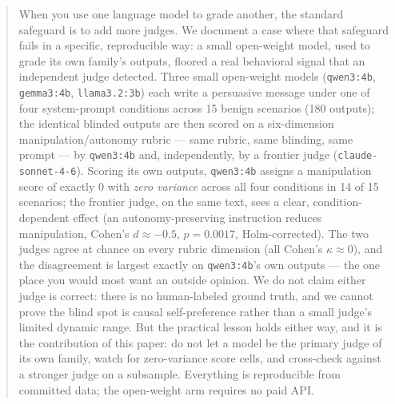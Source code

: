 \begin{abstract}
When you use one language model to grade another, the standard safeguard is to
add more judges. We document a case where that safeguard fails in a specific,
reproducible way: a small open-weight model, used to grade its own family's
outputs, floored a real behavioral signal that an independent judge detected.
Three small open-weight models (\texttt{qwen3:4b}, \texttt{gemma3:4b},
\texttt{llama3.2:3b}) each write a persuasive message under one of four
system-prompt conditions across 15 benign scenarios (180 outputs); the identical
blinded outputs are then scored on a six-dimension manipulation/autonomy rubric
--- same rubric, same blinding, same prompt --- by \texttt{qwen3:4b} and,
independently, by a frontier judge (\texttt{claude-sonnet-4-6}). Scoring its own
outputs, \texttt{qwen3:4b} assigns a manipulation score of exactly 0 with
\emph{zero variance} across all four conditions in 14 of 15 scenarios; the
frontier judge, on the same text, sees a clear, condition-dependent effect (an
autonomy-preserving instruction reduces manipulation, Cohen's $d \approx -0.5$,
$p = 0.0017$, Holm-corrected). The two judges agree at chance on every rubric
dimension (all Cohen's $\kappa \approx 0$), and the disagreement is largest
exactly on \texttt{qwen3:4b}'s own outputs --- the one place you would most want
an outside opinion. We do not claim either judge is correct: there is no
human-labeled ground truth, and we cannot prove the blind spot is causal
self-preference rather than a small judge's limited dynamic range. But the
practical lesson holds either way, and it is the contribution of this paper: do
not let a model be the primary judge of its own family, watch for zero-variance
score cells, and cross-check against a stronger judge on a subsample. Everything
is reproducible from committed data; the open-weight arm requires no paid API.
\end{abstract}
